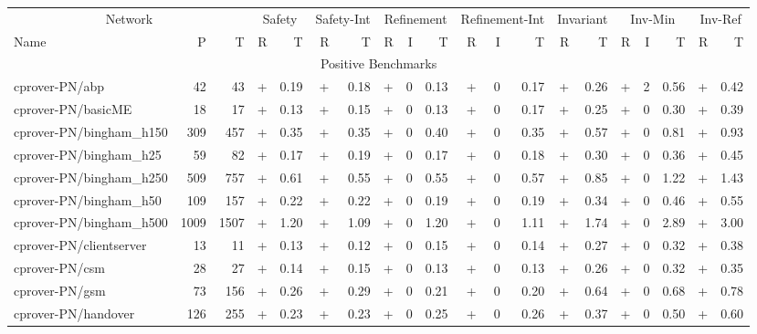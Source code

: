 \documentclass{article}
\begin{document}
\begin{table}[h]
\begin{center}
  \begin{tabular}{ | l | r | r | *{17}{ r | } } %
    \hline
           \multicolumn{3}{|c|}{Network}
         & \multicolumn{2}{|c|}{Safety}
         & \multicolumn{2}{|c|}{Safety-Int}
         & \multicolumn{3}{|c|}{Refinement}
         & \multicolumn{3}{|c|}{Refinement-Int}
         & \multicolumn{2}{|c|}{Invariant}
         & \multicolumn{3}{|c|}{Inv-Min}
         & \multicolumn{2}{|c|}{Inv-Ref} \\
    Name & P & T
        & R & T
        & R & T
        & R & I & T
        & R & I & T
        & R & T
        & R & I & T
        & R & T \\
    \hline
        \multicolumn{20}{|c|}{Positive Benchmarks} \\
    \hline
cprover-PN/abp & 42 & 43 & + & 0.19 & + & 0.18 & + & 0 & 0.13 & + & 0 & 0.17 & + & 0.26 & + & 2 & 0.56 & + & 0.42 \\
cprover-PN/basicME & 18 & 17 & + & 0.13 & + & 0.15 & + & 0 & 0.13 & + & 0 & 0.17 & + & 0.25 & + & 0 & 0.30 & + & 0.39 \\
cprover-PN/bingham\_h150 & 309 & 457 & + & 0.35 & + & 0.35 & + & 0 & 0.40 & + & 0 & 0.35 & + & 0.57 & + & 0 & 0.81 & + & 0.93 \\
cprover-PN/bingham\_h25 & 59 & 82 & + & 0.17 & + & 0.19 & + & 0 & 0.17 & + & 0 & 0.18 & + & 0.30 & + & 0 & 0.36 & + & 0.45 \\
cprover-PN/bingham\_h250 & 509 & 757 & + & 0.61 & + & 0.55 & + & 0 & 0.55 & + & 0 & 0.57 & + & 0.85 & + & 0 & 1.22 & + & 1.43 \\
cprover-PN/bingham\_h50 & 109 & 157 & + & 0.22 & + & 0.22 & + & 0 & 0.19 & + & 0 & 0.19 & + & 0.34 & + & 0 & 0.46 & + & 0.55 \\
cprover-PN/bingham\_h500 & 1009 & 1507 & + & 1.20 & + & 1.09 & + & 0 & 1.20 & + & 0 & 1.11 & + & 1.74 & + & 0 & 2.89 & + & 3.00 \\
cprover-PN/clientserver & 13 & 11 & + & 0.13 & + & 0.12 & + & 0 & 0.15 & + & 0 & 0.14 & + & 0.27 & + & 0 & 0.32 & + & 0.38 \\
cprover-PN/csm & 28 & 27 & + & 0.14 & + & 0.15 & + & 0 & 0.13 & + & 0 & 0.13 & + & 0.26 & + & 0 & 0.32 & + & 0.35 \\
cprover-PN/gsm & 73 & 156 & + & 0.26 & + & 0.29 & + & 0 & 0.21 & + & 0 & 0.20 & + & 0.64 & + & 0 & 0.68 & + & 0.78 \\
cprover-PN/handover & 126 & 255 & + & 0.23 & + & 0.23 & + & 0 & 0.25 & + & 0 & 0.26 & + & 0.37 & + & 0 & 0.50 & + & 0.60 \\

\end{tabular}
\end{center}
\end{table}
\end{document}
